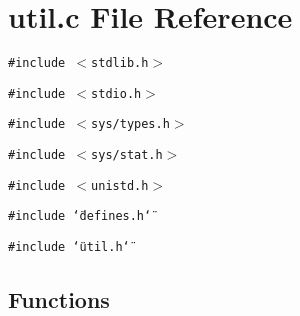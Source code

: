 \section{util.c File Reference}
\label{util_8c}
{\tt \#include $<$stdlib.h$>$}\par
{\tt \#include $<$stdio.h$>$}\par
{\tt \#include $<$sys/types.h$>$}\par
{\tt \#include $<$sys/stat.h$>$}\par
{\tt \#include $<$unistd.h$>$}\par
{\tt \#include \char`\"{}defines.h\char`\"{}}\par
{\tt \#include \char`\"{}util.h\char`\"{}}\par
\subsection*{Functions}
